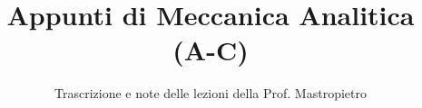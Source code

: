 \documentclass[a4paper,12pt]{article}
\title{Appunti di Meccanica Analitica (A-C)}
\author{Trascrizione e note delle lezioni della Prof. Mastropietro}
\date{}
\begin{document}
\maketitle
\projectintro
\tableofcontents
\newpage

\end{document}
